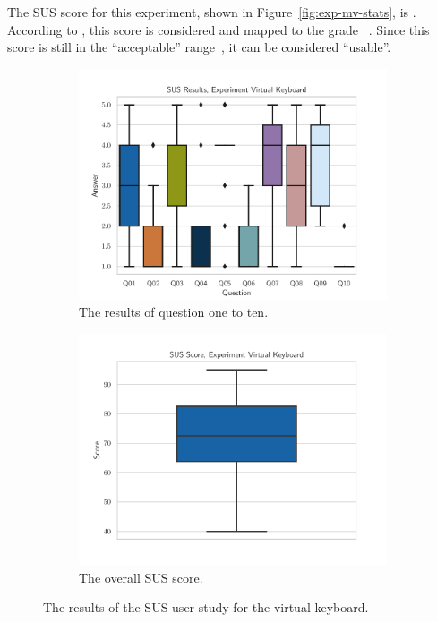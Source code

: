 The \ac{SUS} score for this experiment, shown in Figure~\ref{fig:exp-mv-stats}, is \evalExpVkSusScore{}.
According to \citeauthor{Bangor.2009}, this score is considered \evalExpVkSusAdj{} and mapped to the grade \evalExpVkSusGrade~\cite[120\psq]{Bangor.2009}. Since this score is still in the \enquote{acceptable} range~\cite[120\psq]{Bangor.2009}, it can be considered \enquote{usable}.

\begin{figure}[H]
	\centering
	\begin{subfigure}{.5\linewidth}%
		\centering
		\includegraphics[width=\linewidth]{figures/evaluation/res_exp_vk.pdf}
		\caption{The results of question one to ten.}\label{fig:res-exp-vk}
	\end{subfigure}%
	\begin{subfigure}{.5\linewidth}%
		\centering
		\includegraphics[width=\linewidth]{figures/evaluation/score_exp_vk.pdf}
		\caption{The overall \ac{SUS} score.}\label{fig:score-exp-vk}
	\end{subfigure}%
	\caption[Virtual keyboard SUS results]{The results of the \ac{SUS} user study for the virtual keyboard.}\label{fig:exp-vk-stats}
\end{figure}

